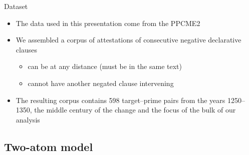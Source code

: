 \documentclass{digs-slides}
\begin{document}
\begin{frame}{Dataset}
    \begin{itemize}
      \item The data used in this presentation come from the
        PPCME2 \parencite{Kroch2001}
      \item We assembled a corpus of attestations of consecutive
        negative declarative clauses
        \begin{itemize}
          \item can be at any distance (must be in the same text)
          \item cannot have another negated clause intervening
        \end{itemize}
      \item The resulting corpus contains 598 target–prime pairs from
        the years 1250–1350, the middle century of the change and the
        focus of the bulk of our analysis
    \end{itemize}
\end{frame}



\subsection{Two-atom model}
\end{document}
